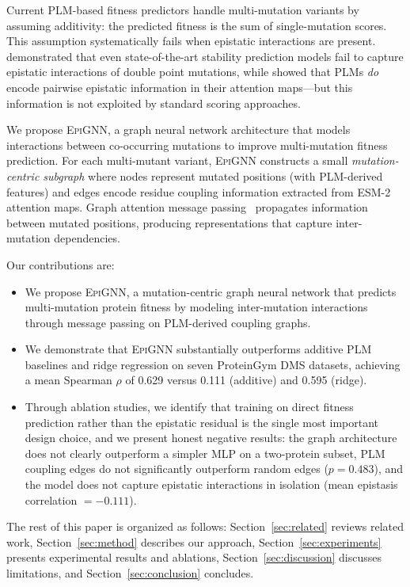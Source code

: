 \documentclass{article}
\newcommand{\epignn}{\textsc{EpiGNN}}
\begin{document}
Current PLM-based fitness predictors handle multi-mutation variants by assuming additivity: the predicted fitness is the sum of single-mutation scores.
This assumption systematically fails when epistatic interactions are present.
\citet{dieckhaus2025protein} demonstrated that even state-of-the-art stability prediction models fail to capture epistatic interactions of double point mutations, while \citet{nambiar2025plm_epistasis} showed that PLMs \emph{do} encode pairwise epistatic information in their attention maps---but this information is not exploited by standard scoring approaches.

We propose \epignn{}, a graph neural network architecture that models interactions between co-occurring mutations to improve multi-mutation fitness prediction.
For each multi-mutant variant, \epignn{} constructs a small \emph{mutation-centric subgraph} where nodes represent mutated positions (with PLM-derived features) and edges encode residue coupling information extracted from ESM-2 attention maps.
Graph attention message passing~\citep{brody2022how} propagates information between mutated positions, producing representations that capture inter-mutation dependencies.

Our contributions are:
\begin{itemize}
    \item We propose \epignn{}, a mutation-centric graph neural network that predicts multi-mutation protein fitness by modeling inter-mutation interactions through message passing on PLM-derived coupling graphs.
    \item We demonstrate that \epignn{} substantially outperforms additive PLM baselines and ridge regression on seven ProteinGym DMS datasets, achieving a mean Spearman $\rho$ of 0.629 versus 0.111 (additive) and 0.595 (ridge).
    \item Through ablation studies, we identify that training on direct fitness prediction rather than the epistatic residual is the single most important design choice, and we present honest negative results: the graph architecture does not clearly outperform a simpler MLP on a two-protein subset, PLM coupling edges do not significantly outperform random edges ($p = 0.483$), and the model does not capture epistatic interactions in isolation (mean epistasis correlation $= -0.111$).
\end{itemize}

The rest of this paper is organized as follows: Section~\ref{sec:related} reviews related work, Section~\ref{sec:method} describes our approach, Section~\ref{sec:experiments} presents experimental results and ablations, Section~\ref{sec:discussion} discusses limitations, and Section~\ref{sec:conclusion} concludes.
\end{document}
